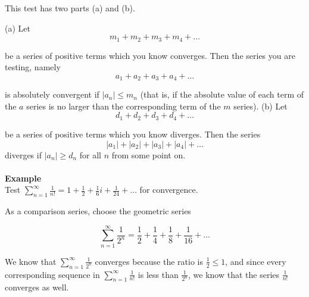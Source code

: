 \documentclass[svgnames]{article}   	%
\begin{document}
\begin{tcolorbox}[colback = red!5!white, colframe = red!50!black, title = The
  Comparison Test]
  
  This test has two parts (a) and (b). 

  (a) Let 
  \[
  m_1 + m_2 + m_3 + m_4 + \dots 
  \]
  
  be a series of positive terms which you know converges. Then the series you
  are testing, namely 
  \[
  a_1 + a_2 + a_3 + a_4 + \dots
  \]
  
  is absolutely convergent if $|a_n| \leq m_n$ (that is, if the absolute value
  of each term of the $a$ series is no larger than the corresponding term of
  the $m$ series). 
  \vspace{5px}
  (b) Let 
  \[
  d_1 + d_2 + d_3 + d_4 + \dots 
  \]
  
  be a series of positive terms which you know diverges. Then the series 
  \[
  |a_1| + |a_2| + |a_3| + |a_4| + \dots
  \]
  diverges if $|a_n| \geq d_n$ for all $n$ from some point on.\\\\
  \textbf{Example} \\
  
  Test $ \sum_{n=1}^{\infty} \frac{1}{n!} = 1 + \frac{1}{2} + \frac{1}{6}i
  + \frac{1}{24} + \dots$ for convergence. 

  \vspace{5px}

  As a comparison series, choose the geometric series 

  \[
  \sum_{n=1}^{\infty} \frac{1}{2^n} = \frac{1}{2} + \frac{1}{4} + \frac{1}{8}
  + \frac{1}{16} + \dots 
  \]
  
  We know that $ \sum_{n=1}^{\infty} \frac{1}{2^n}$ converges because the ratio
  is $\frac{1}{2} \leq 1$, and since every corresponding sequence in
  $ \sum_{n=1}^{\infty} \frac{1}{n!}$ is less than $\frac{1}{2^n}$, we know
  that the series $\frac{1}{n!}$ converges as well. 

\end{tcolorbox}
\vspace{5px}
\end{document}
